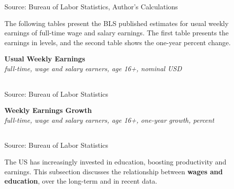 \documentclass{report}
\newcommand{\tbllink}[1]{\href{https://raw.githubusercontent.com/bdecon/US-chartbook/master/chartbook/data/#1}{\faTable}}
\begin{document}
{\begin{minipage}{0.76\textwidth}
\footnotesize{Source: Bureau of Labor Statistics, Author's Calculations} \hfill \tbllink{uwe_bls_gr.csv} \ \ \tbllink{uwe_cps.csv}
\vspace{2mm}

\small The following tables present the BLS published estimates for usual weekly earnings of full-time wage and salary earnings. The first table presents the earnings in levels, and the second table shows the one-year percent change.
\vspace{2mm}

\normalsize \textbf{Usual Weekly Earnings}\\
\footnotesize{\textit{full-time, wage and salary earners, age 16+, nominal USD}}\\
 \setlength{\tabcolsep}{3.1pt} \color{black!90}
		{\renewcommand{\arraystretch}{1.55}
		 \begin{tabular}{p{17mm} R{8.8mm} R{8.8mm} R{8.8mm} R{8.8mm} R{8.8mm} R{8.8mm} 
		   R{8.8mm} R{8.8mm} R{8.8mm} R{8.8mm}}
			  \hline
		\end{tabular}}
\vspace{-3mm}
		
\footnotesize{Source: Bureau of Labor Statistics}
\vspace{3mm}

\normalsize \textbf{Weekly Earnings Growth}\\
\footnotesize{\textit{full-time, wage and salary earners, age 16+, one-year growth, percent}}\\
 \setlength{\tabcolsep}{3.1pt} \color{black!90}
	{\renewcommand{\arraystretch}{1.55}
		\begin{tabular}{p{17mm} R{8.8mm} R{8.8mm} R{8.8mm} R{8.8mm} R{8.8mm} R{8.8mm} 
		   R{8.8mm} R{8.8mm} R{8.8mm} R{8.8mm}}
			  \hline
		\end{tabular}}\vspace{-2mm}
				
\footnotesize{Source: Bureau of Labor Statistics}
\end{minipage}
\newpage
\begin{minipage}{0.76\textwidth}
\small The US has increasingly invested in education, boosting productivity and earnings. This subsection discusses the relationship between \textbf{wages and education}, over the long-term and in recent data. 




\end{minipage}}
\end{document}
